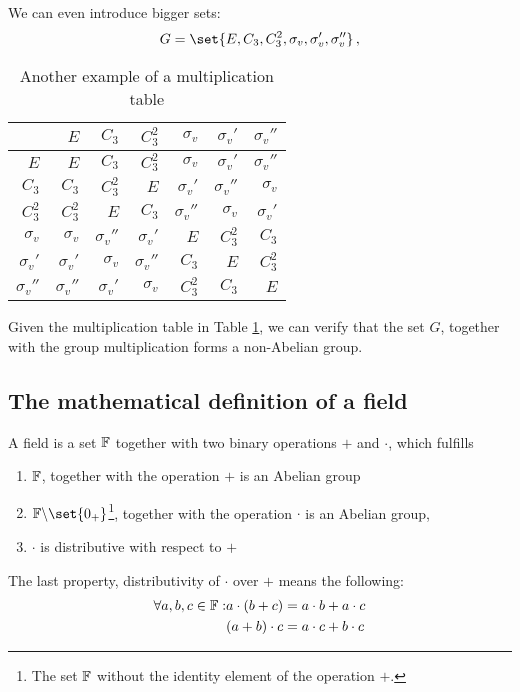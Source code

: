         We can even introduce bigger sets:
        \begin{equation}
            G = \set{E, C_3, C^2_3, \sigma_v, \sigma_v', \sigma_v''} \thinspace ,
        \end{equation}
        \begin{table}[H] \centering
            \begin{tabular}{r|rrrrrr}
                            & $E$           & $C_3$         & $C^2_3$       & $\sigma_v$    & $\sigma_v'$   & $\sigma_v''$  \\ \hline

                $E$         & $E$           & $C_3$         & $C^2_3$       & $\sigma_v$    & $\sigma_v'$   & $\sigma_v''$  \\
                $C_3$       & $C_3$         & $C^2_3$       & $E$           & $\sigma_v'$   & $\sigma_v''$  & $\sigma_v$    \\
                $C^2_3$     & $C^2_3$       & $E$           & $C_3$         & $\sigma_v''$  & $\sigma_v$    & $\sigma_v'$   \\
                $\sigma_v$  & $\sigma_v$    & $\sigma_v''$  & $\sigma_v'$   & $E$           & $C^2_3$       & $C_3$         \\
                $\sigma_v'$ & $\sigma_v'$   & $\sigma_v$    & $\sigma_v''$  & $C_3$         & $E$           & $C^2_3$       \\
                $\sigma_v''$& $\sigma_v''$  & $\sigma_v'$   & $\sigma_v$    & $C^2_3$       & $C_3$         & $E$
            \end{tabular}
            \caption{Another example of a multiplication table}
            \label{table:multiplication_table_C3v}
        \end{table}
        Given the multiplication table in Table \ref{table:multiplication_table_C3v}, we can verify that the set $G$, together with the group multiplication forms a non-Abelian group. \\

    \subsection{The mathematical definition of a field}
        A field is a set $\mathbb{F}$ together with two binary operations $+$ and $\cdot$, which fulfills
        \begin{enumerate}
            \item $\mathbb{F}$, together with the operation $+$ is an Abelian group
            \item $\F\backslash\set{0_+}$\footnote{The set $\mathbb{F}$ without the identity element of the operation $+$.}, together with the operation $\cdot$ is an Abelian group,
            \item $\cdot$ is distributive with respect to $+$
        \end{enumerate}
        The last property, distributivity of $\cdot$ over $+$ means the following:
        \begin{align}
            \forall a, b, c \in \mathbb{F}: &a \cdot (b + c) = a \cdot b + a \cdot c \\
            & (a + b) \cdot c = a \cdot c + b \cdot c
        \end{align}

